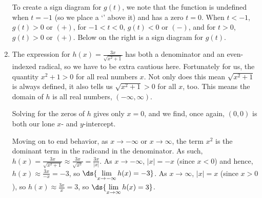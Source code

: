 \documentclass{ximera}
\begin{document}
\begin{example}
\begin{enumerate}
\smallskip

To create a sign diagram for $g(t)$, we note that the function is undefined when $t = -1$ (so we place a `\textinterrobang' above it) and has a zero $t=0$.  When  $t<-1$, $g(t) > 0$ or $(+)$, for $-1<t<0$, $g(t)<0$ or $(-)$, and for $t>0$, $g(t) > 0$ or $(+)$.  Below on the right is a sign diagram for $g(t)$.

\begin{center}
% 
\end{center} 

\begin{center}
\end{center}

 \item  The expression for $h(x) = \frac{3x}{\sqrt{x^2 + 1}}$ has both a denominator and an even-indexed radical, so we have to be extra cautious here.  Fortunately for us, the quantity $x^2+1 >0$ for all real numbers $x$. Not only does this mean $\sqrt{x^2+1}$ is always defined, it also tells us $\sqrt{x^2+1}>0$ for all $x$, too.  This means the domain of $h$ is all real numbers, $(-\infty, \infty)$.
 
Solving for the zeros of $h$ gives only $x = 0$, and we find, once again, $(0,0)$ is both our lone $x$- and $y$-intercept.  

Moving on to end behavior, as $x \rightarrow -\infty$ or  $x \rightarrow \infty$, the term $x^2$ is the dominant term in the radicand in the denominator. As such, $h(x) = \frac{3x}{\sqrt{x^2 + 1}} \approx \frac{3x}{\sqrt{x^2}} = \frac{3x}{|x|}$.  As $x \rightarrow -\infty$, $|x| = -x$ (since $x<0$) and hence, $h(x)\approx  \frac{3x}{-x} = -3$, so $\ds{\lim_{x \rightarrow -\infty} h(x) =  -3}$.   As $x \rightarrow \infty$, $|x| = x$ (since $x>0$), so $h(x) \approx \frac{3x}{x} = 3$, so $\ds{\lim_{x \rightarrow \infty} h(x) =  3}$. 
 

\end{enumerate}
\end{example}
\end{document}
